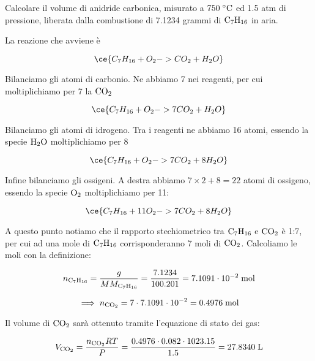 \newpage

\begin{esercizio}
    Calcolare il volume di anidride carbonica, misurato a $750 \; ^{\circ}\rm C$ ed 1.5 atm di pressione, liberata dalla combustione di 7.1234 grammi di $\rm C_7H_{16}$ in aria.
\end{esercizio}
\begin{soluzione}
    La reazione che avviene è

$$\ce{C_7H_{16} + O_2 -> CO_2 + H_2O}$$

Bilanciamo gli atomi di carbonio. Ne abbiamo 7 nei reagenti, per cui moltiplichiamo per 7 la $\rm CO_2$

$$\ce{C_7H_{16} + O_2 -> 7CO_2 + H_2O}$$

Bilanciamo gli atomi di idrogeno. Tra i reagenti ne abbiamo 16 atomi, essendo la specie $\rm H_2O$ moltiplichiamo per 8

$$\ce{C_7H_{16} + O_2 -> 7CO_2 + 8H_2O}$$

Infine bilanciamo gli ossigeni. A destra abbiamo $7 \times 2 + 8=22$ atomi di ossigeno, essendo la specie $\rm O_2$ moltiplichiamo per 11:

$$\ce{C_7H_{16} + 11O_2 -> 7CO_2 + 8H_2O}$$

A questo punto notiamo che il rapporto stechiometrico tra $\rm C_7H_{16}$ e $\rm CO_2$ è 1:7, per cui ad una mole di $\rm C_7H_{16}$ corrisponderanno 7 moli di $\rm CO_2$. Calcoliamo le moli con la definizione:

$$n_{\text{C}_7\text{H}_{16}}=\frac{g}{MM_{\text{C}_7\text{H}_{16}}}
=\frac{7.1234}{100.201}=7.1091 \cdot 10^{-2} \; \rm mol$$

$$\implies
n_{\rm CO_2}
=7 \cdot 7.1091 \cdot 10^{-2}=0.4976 \; \rm mol$$

Il volume di $\rm CO_2$ sarà ottenuto tramite l'equazione di stato dei gas:

$$V_{\rm CO_2}=\frac{n_{\rm CO_2}RT}{P}
=\frac{0.4976 \cdot 0.082 \cdot 1023.15}{1.5}=27.8340 \; \rm L$$
\end{soluzione}

\newpage

